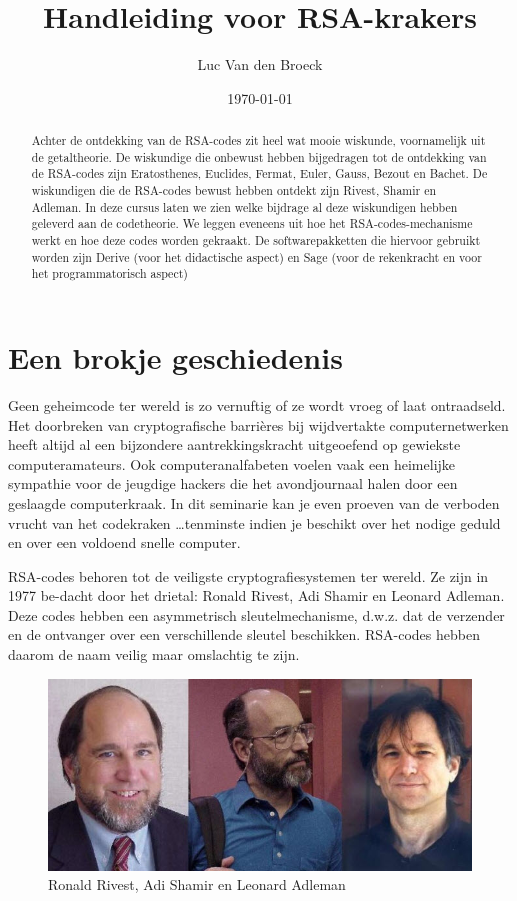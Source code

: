 
\title{Handleiding voor RSA-krakers}
\author{Luc Van den Broeck}
\date{\today}


\maketitle

\begin{abstract}
\noindent Achter de ontdekking van de RSA-codes zit heel wat mooie wiskunde, voornamelijk uit de getaltheorie. De wiskundige die onbewust hebben bijgedragen tot de ontdekking van de RSA-codes zijn Eratosthenes, Euclides, Fermat, Euler, Gauss, Bezout en Bachet. De wiskundigen die de RSA-codes bewust hebben ontdekt zijn Rivest, Shamir en Adleman. In deze cursus laten we zien welke bijdrage al deze wiskundigen hebben geleverd aan de codetheorie. We leggen eveneens uit hoe het RSA-codes-mechanisme werkt en hoe deze codes worden gekraakt. De softwarepakketten die hiervoor gebruikt worden zijn Derive (voor het didactische aspect) en Sage (voor de rekenkracht en voor het programmatorisch aspect)
\end{abstract}

\section{Een brokje geschiedenis}
Geen geheimcode ter wereld is zo vernuftig of ze wordt vroeg of laat ontraadseld. Het doorbreken van cryptografische barrières bij wijdvertakte computernetwerken heeft altijd al een bijzondere aantrekkingskracht uitgeoefend op gewiekste computeramateurs. Ook computeranalfabeten voelen vaak een heimelijke sympathie voor de jeugdige hackers die het avondjournaal halen door een geslaagde computerkraak. In dit seminarie kan je even proeven van de verboden vrucht van het codekraken \ldots tenminste indien je beschikt over het nodige geduld en over een voldoend snelle computer.

RSA-codes behoren tot de veiligste cryptografiesystemen ter wereld. Ze zijn in 1977 be-dacht door het drietal: Ronald Rivest, Adi Shamir en Leonard Adleman. Deze codes hebben een asymmetrisch sleutelmechanisme, d.w.z. dat de verzender en de ontvanger over een verschillende sleutel beschikken. RSA-codes hebben daarom de naam veilig maar omslachtig te zijn.

\begin{figure} [h]
\label{rivest}
\centering
\includegraphics[width=\textwidth]{RivestShamirAdleman.jpg}
\caption{Ronald Rivest, Adi Shamir en Leonard Adleman}
\end{figure}

